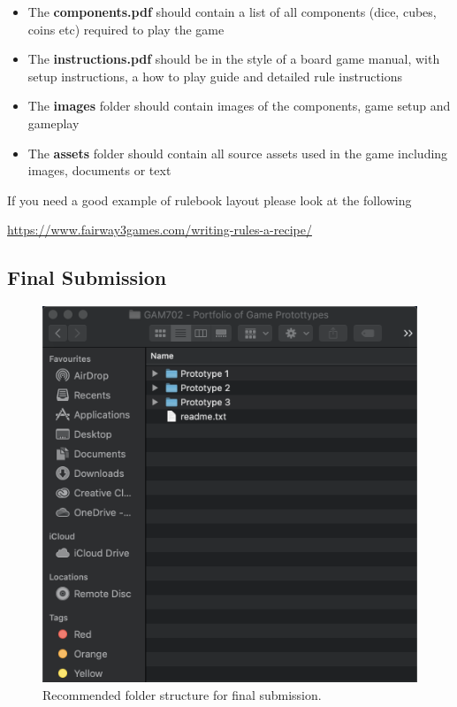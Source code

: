 \documentclass{../../fal_assignment}
\begin{document}
\begin{itemize}
	\item The \textbf{components.pdf} should contain a list of all components (dice, cubes, coins etc) required to play the game
	\item The \textbf{instructions.pdf} should be in the style of a board game manual, with setup instructions, a how to play guide and detailed rule instructions
	\item The \textbf{images} folder should contain images of the components, game setup and gameplay
	\item The \textbf{assets} folder should contain all source assets used in the game including images, documents or text
\end{itemize}

If you need a good example of rulebook layout please look at the following

\url{https://www.fairway3games.com/writing-rules-a-recipe/}

\pagebreak
\subsection*{Final Submission} 

\begin{figure}[H]
	\begin{center}
		\includegraphics[height=0.4\textheight]{portfolio_folder_structure}
	\end{center}
	\caption{Recommended folder structure for final submission.}
	\label{fig:portfolio_folder_structure}
\end{figure}
\end{document}
